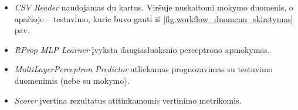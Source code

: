 \begin{itemize}
    \item \textit{CSV Reader} naudojamas du kartus. Viršuje nuskaitomi mokymo duomenis, o apačioje – testavimo, kurie buvo gauti iš \ref{fig:workflow_duomenu_skirstymas} pav.
    \item \textit{RProp MLP Learner} įvyksta daugiasluoksnio perceptrono apmokymas.
    \item \textit{MultiLayerPerceptron Predictor} atliekamas prognozavimas su testavimo duomenimis (nebe su mokymo).
    \item \textit{Scorer} įvertina rezultatus atitinkamomis vertinimo metrikomis.
\end{itemize}